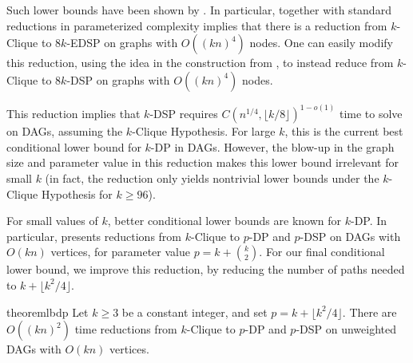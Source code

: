 \documentclass[11pt]{article}
\theoremstyle{definition}
\begin{document}
Such lower bounds have been shown by \cite{Chitnis2021}.
In particular, \cite{Chitnis2021} together with standard reductions in parameterized complexity \cite[Proofs of Theorems 14.28 and 14.30]{parameterized-complexity-book}
implies that there is a reduction from \textsf{$k$-Clique} to  \textsf{$8k$-EDSP} on graphs with $O((kn)^4)$ nodes.
One can easily modify this reduction, using the idea in the construction from \cite[Section 6]{Geometric-Lens}, to instead reduce from \textsf{$k$-Clique} to \textsf{$8k$-DSP} on graphs with $O((kn)^4)$ nodes.

This reduction implies that \textsf{$k$-DSP} requires $C(n^{1/4},\lfloor k/8\rfloor)^{1-o(1)}$ time to solve on DAGs, assuming the \textsf{$k$-Clique Hypothesis}.
For large $k$, this is the current best  conditional lower bound for \textsf{$k$-DP} in DAGs.
However, the blow-up in the graph size and parameter value in this reduction makes this lower bound irrelevant for small  $k$
(in fact, the reduction only yields nontrivial lower bounds under the \textsf{$k$-Clique} Hypothesis for $k\ge 96$).




For small values of $k$, better conditional lower bounds are known for \textsf{$k$-DP}.
In particular, \cite{Slivkins2010} presents reductions from \textsf{$k$-Clique} to \textsf{$p$-DP} and \textsf{$p$-DSP} on DAGs with $O(kn)$ vertices, for parameter value $p = k + \binom{k}{2}$.
For our final conditional lower bound, we improve this reduction, by reducing the number of paths needed to $k+ \lfloor k^2/4\rfloor$.



\begin{restatable}{theorem}{lbdp}
    \label{lbdp}
    Let $k\ge 3$ be a constant integer, and set $p=k+ \lfloor k^2/4\rfloor$.
    There are $O((kn)^2)$ time reductions from \textsf{$k$-Clique} to \textsf{$p$-DP} and \textsf{$p$-DSP} on unweighted DAGs with $O(kn)$ vertices.
\end{restatable}
\end{document}
